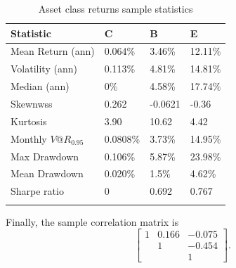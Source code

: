 \begin{table}[h]
	\centering
	\begin{tabular}{@{}llll@{}} \toprule
		Statistic & C & B & E \\ \midrule
		Mean Return (ann) & 0.064\%  & 3.46\% & 12.11\%\\
		\addlinespace[0.5em]
		Volatility (ann) & 0.113\%  & 4.81\% & 14.81\% \\
		\addlinespace[0.5em]
		Median (ann) &	0\% & 4.58\% & 17.74\% \\
		\addlinespace[0.5em]
		Skewnwss & 0.262 & -0.0621 & -0.36 \\
		\addlinespace[0.5em]
		Kurtosis & 3.90 & 10.62 & 4.42 \\
		\addlinespace[0.5em]
		Monthly $V@R_{0.95}$ & 0.0808\% & 3.73\% & 14.95\%\\
		\addlinespace[0.5em]
		Max Drawdown & 0.106\% & 5.87\% & 23.98\% \\
		\addlinespace[0.5em]
		Mean Drawdown & 0.020\% & 1.5\% & 4.62\% \\
		\addlinespace[0.5em]
		Sharpe ratio & 0 & 0.692 & 0.767 \\ \bottomrule
		\addlinespace[0.5em]
	\end{tabular}
	\caption{Asset class returns sample statistics}
	\label{tab:sampleStatistics}
\end{table}

Finally, the sample correlation matrix is  
\[ 
\begin{bmatrix}
1 & 0.166 & -0.075 \\
  &  1    & -0.454 \\
  &       &  1
\end{bmatrix}.
\]

